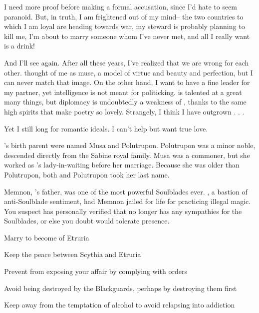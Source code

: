 \documentclass[char]{Kos}
\begin{document}
I need more proof before making a formal accusation, since I'd hate to seem paranoid. But, in truth, I am frightened out of my mind-- the two countries to which I am loyal are heading towards war, my steward is probably planning to kill me, I'm about to marry someone whom I've never met, and all I really want is a drink!

And I'll see \cPoet{} again. After all these years, I've realized that we are wrong for each other. \cPoet{\They} thought of me as \cPoet{\their} muse, a model of virtue and beauty and perfection, but I can never match that image. On the other hand, I want to have a fine leader for my partner, yet \cPoet{\their} intelligence is not meant for politicking. \cPoet{\They} is talented at a great many things, but diplomacy is undoubtedly a weakness of \cPoet{\theirs}, thanks to the same high spirits that make \cPoet{\their} poetry so lovely. Strangely, I think I have outgrown \cPoet{\them} . . .

Yet I still long for \cPoet{\their} romantic ideals. I can't help but want true love.

\begin{itemz}[Notes]
  \item \cWard{}'s birth parent were named Musa and Polutrupon. Polutrupon was a minor noble, descended directly from the Sabine royal family. Musa was a commoner, but she worked as \cScythiaQueen{}'s lady-in-waiting before her marriage. Because she was older than Polutrupon, both \cWard{} and Polutrupon took her last name.
  \item Memnon, \cButler{}'s father, was one of the most powerful Soulblades ever. \cScythiaQueen{}, a bastion of anti-Soulblade sentiment, had Memnon jailed for life for practicing illegal magic. You suspect \cScythiaQueen{} has personally verified that \cButler{} no longer has any sympathies for the Soulblades, or else you doubt \cScythiaQueen{\they} would tolerate \cButler{\their} presence.
\end{itemz}

\begin{itemz}[Goals]
 \item Marry \cGroom{} to become \cBride{\prince} of Etruria
 \item Keep the peace between Scythia and Etruria
 \item Prevent \cEtruriaKing{} from exposing your affair by complying with \cEtruriaKing{\their} orders
 \item Avoid being destroyed by the Blackguards, perhaps by destroying them first
 \item Keep away from the temptation of alcohol to avoid relapsing into addiction
\end{itemz}
\end{document}

